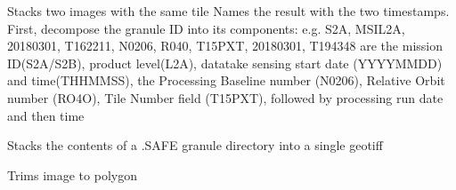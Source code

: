 \documentclass[letterpaper,10pt,english]{sphinxmanual}
\begin{document}

\begin{fulllineitems}
\label{\detokenize{index:pyeo.raster_manipulation.stack_old_and_new_images}}
Stacks two images with the same tile
Names the result with the two timestamps.
First, decompose the granule ID into its components:
e.g. S2A, MSIL2A, 20180301, T162211, N0206, R040, T15PXT, 20180301, T194348
are the mission ID(S2A/S2B), product level(L2A), datatake sensing start date (YYYYMMDD) and time(THHMMSS),
the Processing Baseline number (N0206), Relative Orbit number (RO4O), Tile Number field (T15PXT),
followed by processing run date and then time

\end{fulllineitems}


\begin{fulllineitems}
\label{\detokenize{index:pyeo.raster_manipulation.stack_sentinel_2_bands}}
Stacks the contents of a .SAFE granule directory into a single geotiff

\end{fulllineitems}


\begin{fulllineitems}
\label{\detokenize{index:pyeo.raster_manipulation.trim_image}}
Trims image to polygon

\end{fulllineitems}
\end{document}
